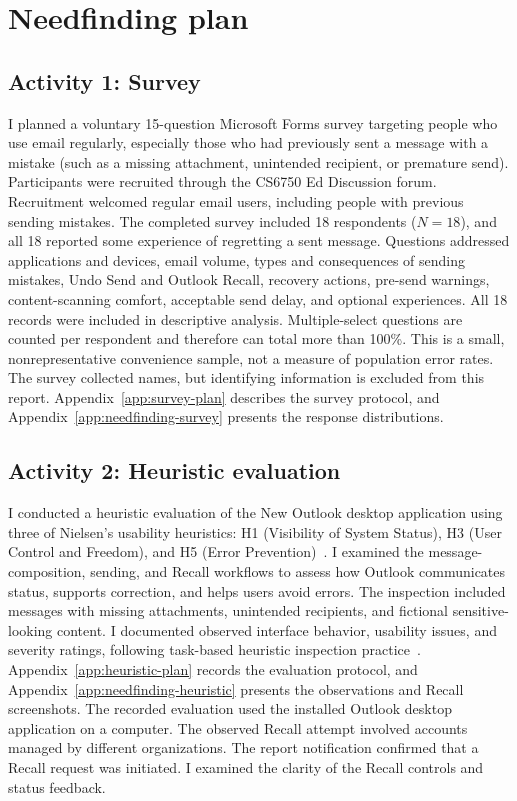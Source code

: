 \documentclass[letterpaper]{jdf}
\begin{document}
\section{Needfinding plan}
\subsection{Activity 1: Survey}
I planned a voluntary 15-question Microsoft Forms survey targeting people who use email regularly, especially those who had previously sent a message with a mistake (such as a missing attachment, unintended recipient, or premature send). Participants were recruited through the CS6750 Ed Discussion forum. Recruitment welcomed regular email users, including people with previous sending mistakes. The completed survey included 18 respondents ($N=18$), and all 18 reported some experience of regretting a sent message. Questions addressed applications and devices, email volume, types and consequences of sending mistakes, Undo Send and Outlook Recall, recovery actions, pre-send warnings, content-scanning comfort, acceptable send delay, and optional experiences. All 18 records were included in descriptive analysis. Multiple-select questions are counted per respondent and therefore can total more than 100\%. This is a small, nonrepresentative convenience sample, not a measure of population error rates. The survey collected names, but identifying information is excluded from this report. Appendix~\ref{app:survey-plan} describes the survey protocol, and Appendix~\ref{app:needfinding-survey} presents the response distributions.

\subsection{Activity 2: Heuristic evaluation}
I conducted a heuristic evaluation of the New Outlook desktop application using three of Nielsen's usability heuristics: H1 (Visibility of System Status), H3 (User Control and Freedom), and H5 (Error Prevention)~\citep{nielsen-heuristics}. I examined the message-composition, sending, and Recall workflows to assess how Outlook communicates status, supports correction, and helps users avoid errors. The inspection included messages with missing attachments, unintended recipients, and fictional sensitive-looking content. I documented observed interface behavior, usability issues, and severity ratings, following task-based heuristic inspection practice~\citep{moran-heuristic}. Appendix~\ref{app:heuristic-plan} records the evaluation protocol, and Appendix~\ref{app:needfinding-heuristic} presents the observations and Recall screenshots. The recorded evaluation used the installed Outlook desktop application on a computer. The observed Recall attempt involved accounts managed by different organizations. The report notification confirmed that a Recall request was initiated. I examined the clarity of the Recall controls and status feedback.
\end{document}
